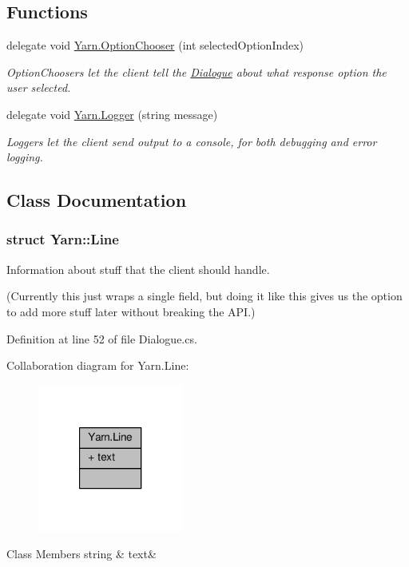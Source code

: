 \subsection*{Functions}
\begin{DoxyCompactItemize}
\item 
delegate void \hyperlink{a00041_a39866cbb03c03a35805d598b5d4ad553}{Yarn.\-Option\-Chooser} (int selected\-Option\-Index)
\begin{DoxyCompactList}\small\item\em Option\-Choosers let the client tell the \hyperlink{a00082}{Dialogue} about what response option the user selected. \end{DoxyCompactList}\item 
delegate void \hyperlink{a00041_a1e50031b945a3a2afafee6f590730568}{Yarn.\-Logger} (string message)
\begin{DoxyCompactList}\small\item\em Loggers let the client send output to a console, for both debugging and error logging. \end{DoxyCompactList}\end{DoxyCompactItemize}


\subsection{Class Documentation}
\label{a00359}
\hypertarget{a00041_a00359}{}
\subsubsection{struct Yarn\-:\-:Line}
Information about stuff that the client should handle. 

(Currently this just wraps a single field, but doing it like this gives us the option to add more stuff later without breaking the A\-P\-I.) 

Definition at line 52 of file Dialogue.\-cs.



Collaboration diagram for Yarn.\-Line\-:
\nopagebreak
\begin{figure}[H]
\begin{center}
\leavevmode
\includegraphics[width=136pt]{a00372}
\end{center}
\end{figure}
\begin{DoxyFields}{Class Members}
\hypertarget{a00041_a81d1f04bbb4cf6642d2bd685bda1da20}{string}\label{a00041_a81d1f04bbb4cf6642d2bd685bda1da20}
&
text&
\\
\hline

\end{DoxyFields}
\label{a00362}
\hypertarget{a00041_a00362}{}
